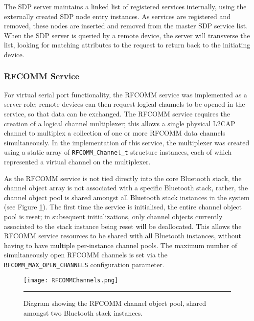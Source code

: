

The SDP server maintains a linked list of registered services internally, using the externally created SDP node entry instances. As services are registered and removed, these nodes are inserted and removed from the master SDP service list. When the SDP server is queried by a remote device, the server will transverse the list, looking for matching attributes to the request to return back to the initiating device.

\FloatBarrier
\subsubsection{RFCOMM Service}

For virtual serial port functionality, the RFCOMM service was implemented as a server role; remote devices can then request logical channels to be opened in the service, so that data can be exchanged. The RFCOMM service requires the creation of a logical channel multiplexer; this allows a single physical L2CAP channel to multiplex a collection of one or more RFCOMM data channels simultaneously. In the implementation of this service, the multiplexer was created using a static array of \lstinline{RFCOMM_Channel_t} structure instances, each of which represented a virtual channel on the multiplexer.

As the RFCOMM service is not tied directly into the core Bluetooth stack, the channel object array is not associated with a specific Bluetooth stack, rather, the channel object pool is shared amongst all Bluetooth stack instances in the system (see Figure \ref{fig:rfcommchannelpool}). The first time the service is initialised, the entire channel object pool is reset; in subsequent initializations, only channel objects currently associated to the stack instance being reset will be deallocated. This allows the RFCOMM service resources to be shared with all Bluetooth instances, without having to have multiple per-instance channel pools. The maximum number of simultaneously open RFCOMM channels is set via the \lstinline{RFCOMM_MAX_OPEN_CHANNELS} configuration parameter.

\begin{figure}[tbph]
	\vspace{1em}
	\centering
		\texttt{[image: RFCOMMChannels.png]}
	\rule{35em}{0.5pt}
	\caption[Diagram of the shared RFCOMM Channel pool.]{Diagram showing the RFCOMM channel object pool, shared amongst two Bluetooth stack instances.}
	\label{fig:rfcommchannelpool}
\end{figure}

